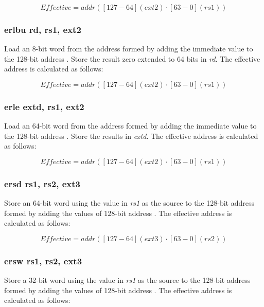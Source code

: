 \documentclass{article}
\begin{document}
\begin{equation}
Effective = addr([127-64](ext2) \cdot [63-0](rs1))
\end{equation}

\subsubsection{erlbu rd, rs1, ext2}

Load an 8-bit word from the address formed by adding the immediate value to the 
128-bit address .  Store the result zero extended to 64 bits in \textit{rd}.  The effective 
address is calculated as follows: 

\begin{equation}
Effective = addr([127-64](ext2) \cdot [63-0](rs1))
\end{equation}

\subsubsection{erle extd, rs1, ext2}

Load an 64-bit word from the address formed by adding the immediate value to the 
128-bit address .  Store the results in \textit{extd}.  
The effective address is calculated as follows:

\begin{equation}
Effective = addr([127-64](ext2) \cdot [63-0](rs1))
\end{equation}

\subsubsection{ersd rs1, rs2, ext3}

Store an 64-bit word using the value in \textit{rs1} as the source 
to the 128-bit address formed by adding the values of
128-bit address .  The effective address is calculated 
as follows: 

\begin{equation}
Effective = addr([127-64](ext3) \cdot [63-0](rs2))
\end{equation}

\subsubsection{ersw rs1, rs2, ext3}

Store a 32-bit word using the value in \textit{rs1} as the source 
to the 128-bit address formed by adding the values of
128-bit address .  The effective address is calculated 
as follows: 
\end{document}
